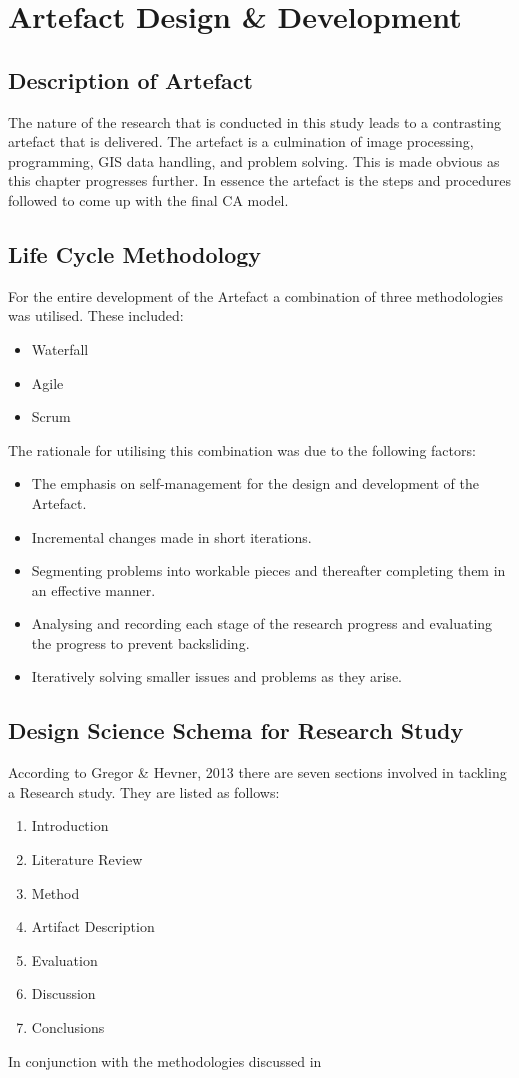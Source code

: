 
\chapter{Artefact Design \& Development} %
\label{Chapter3} %
\section{Description of Artefact}
The nature of the research that is conducted in this study leads to a contrasting artefact that is delivered. The artefact is a culmination of image processing, programming, GIS data handling, and problem solving. This is made obvious as this chapter progresses further. In essence the artefact is the steps and procedures followed to come up with the final CA model.
\section{Life Cycle Methodology}
\label{sec:lcm}
For the entire development of the Artefact a combination of three methodologies was utilised. These included:
\begin{itemize}
\item Waterfall
\item Agile
\item Scrum
\end{itemize}
The rationale for utilising this combination was due to the following factors:
\begin{itemize}
\item The emphasis on self-management for the design and development of the Artefact.
\item Incremental changes made in short iterations.
\item Segmenting problems into workable pieces and thereafter completing them in an effective manner.
\item Analysing and recording each stage of the research progress and evaluating the progress to prevent backsliding.
\item Iteratively solving smaller issues and problems as they arise.
\end{itemize}
\section{Design Science Schema for Research Study}
According to Gregor \& Hevner, 2013 there are seven sections involved in tackling a Research study. They are listed as follows:\cite{dssteps}
\begin{enumerate}
\item Introduction
\item Literature Review
\item Method
\item Artifact Description
\item Evaluation
\item Discussion
\item Conclusions
\end{enumerate}
In conjunction with the methodologies discussed in 
